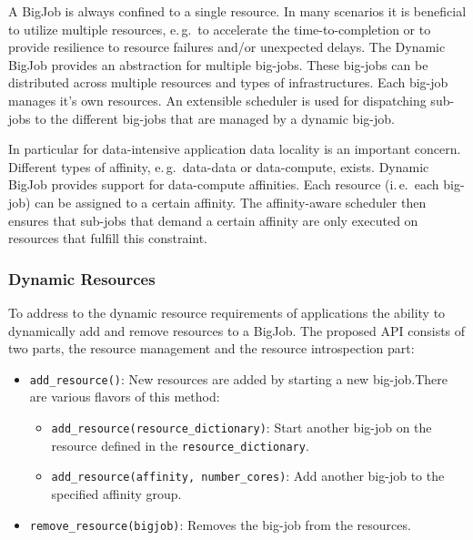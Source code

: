 \documentclass[]{article}
\begin{document}
A BigJob is always confined to a single resource. In many scenarios it is
beneficial to utilize multiple resources, e.\,g.\ to accelerate the
time-to-completion or to provide resilience to resource failures and/or
unexpected delays. The Dynamic BigJob provides an abstraction for multiple
big-jobs. These big-jobs can be distributed across multiple resources and types
of infrastructures. Each big-job manages it's own resources. An extensible
scheduler is used for dispatching sub-jobs to the different big-jobs that are
managed by a dynamic big-job.



In particular for data-intensive application data locality is an important
concern. Different types of affinity, e.\,g.\ data-data or data-compute, exists.
Dynamic BigJob provides support for data-compute affinities. Each resource
(i.\,e.\ each big-job) can be assigned to a certain affinity. The affinity-aware
scheduler then ensures that sub-jobs that demand a certain affinity are only
executed on resources that fulfill this constraint.


\subsubsection{Dynamic Resources}

To address to the dynamic resource requirements of applications the ability to
dynamically add and remove resources to a BigJob. The proposed API consists of
two parts, the resource management and the resource introspection part:
\begin{itemize}
    \item \texttt{add\_resource()}: New resources are added by starting a new
    big-job.There are various flavors of this method:
    \begin{itemize}
        \item \texttt{add\_resource(re\-sour\-ce\_dic\-tionary)}: Start another big-job on the resource defined in the \texttt{resource\_dictionary}.
        \item \texttt{add\_resource(affinity, number\_cores)}: Add another big-job to the specified affinity group.
    \end{itemize}
    \item \texttt{remove\_resource(bigjob)}: Removes the big-job from the
    resources.
\end{itemize}
\end{document}

